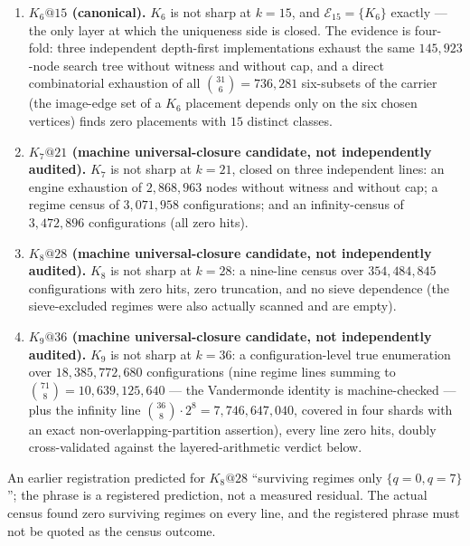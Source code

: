 \begin{enumerate}[leftmargin=2.2em,itemsep=0.2em]
\item \textbf{$K_6@15$ (canonical).} $K_6$ is not sharp at $k=15$, and
$\mathcal{E}_{15}=\{K_6\}$ exactly --- the only layer at which the
uniqueness side is closed. The evidence is four-fold: three independent
depth-first implementations exhaust the same $145{,}923$-node search tree
without witness and without cap, and a direct combinatorial exhaustion of
all $\binom{31}{6}=736{,}281$ six-subsets of the carrier (the image-edge
set of a $K_6$ placement depends only on the six chosen vertices) finds
zero placements with $15$ distinct classes.
\item \textbf{$K_7@21$ (machine universal-closure candidate, not
independently audited).} $K_7$ is not sharp at $k=21$, closed on three
independent lines: an engine exhaustion of $2{,}868{,}963$ nodes without
witness and without cap; a regime census of $3{,}071{,}958$ configurations;
and an infinity-census of $3{,}472{,}896$ configurations (all zero hits).
\item \textbf{$K_8@28$ (machine universal-closure candidate, not
independently audited).} $K_8$ is not sharp at $k=28$: a nine-line census
over $354{,}484{,}845$ configurations with zero hits, zero truncation, and
no sieve dependence (the sieve-excluded regimes were also actually
scanned and are empty).
\item \textbf{$K_9@36$ (machine universal-closure candidate, not
independently audited).} $K_9$ is not sharp at $k=36$: a configuration-level
true enumeration over $18{,}385{,}772{,}680$ configurations (nine regime
lines summing to $\binom{71}{8}=10{,}639{,}125{,}640$ --- the Vandermonde
identity is machine-checked --- plus the infinity line
$\binom{36}{8}\cdot2^8=7{,}746{,}647{,}040$, covered in four shards with an
exact non-overlapping-partition assertion), every line zero hits,
doubly cross-validated against the layered-arithmetic verdict below.
\end{enumerate}

\begin{remark}\label{rem:claregistered}
An earlier registration predicted for $K_8@28$ ``surviving regimes only
$\{q=0,q=7\}$''; the phrase is a registered prediction, not a measured
residual. The actual census found zero surviving regimes on every line,
and the registered phrase must not be quoted as the census outcome.
\end{remark}

